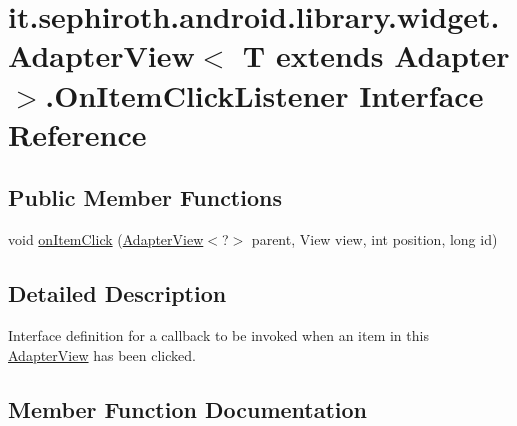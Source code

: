 \hypertarget{interfaceit_1_1sephiroth_1_1android_1_1library_1_1widget_1_1_adapter_view_1_1_on_item_click_listener}{}\section{it.\+sephiroth.\+android.\+library.\+widget.\+Adapter\+View$<$ T extends Adapter $>$.On\+Item\+Click\+Listener Interface Reference}
\label{interfaceit_1_1sephiroth_1_1android_1_1library_1_1widget_1_1_adapter_view_1_1_on_item_click_listener}
\subsection*{Public Member Functions}
\begin{DoxyCompactItemize}
\item 
void \hyperlink{interfaceit_1_1sephiroth_1_1android_1_1library_1_1widget_1_1_adapter_view_1_1_on_item_click_listener_aec9fff2d7de90e08837ae0df6b2f51b4}{on\+Item\+Click} (\hyperlink{classit_1_1sephiroth_1_1android_1_1library_1_1widget_1_1_adapter_view}{Adapter\+View}$<$?$>$ parent, View view, int position, long id)
\end{DoxyCompactItemize}


\subsection{Detailed Description}
Interface definition for a callback to be invoked when an item in this \hyperlink{classit_1_1sephiroth_1_1android_1_1library_1_1widget_1_1_adapter_view}{Adapter\+View} has been clicked. 

\subsection{Member Function Documentation}
\mbox{\label{interfaceit_1_1sephiroth_1_1android_1_1library_1_1widget_1_1_adapter_view_1_1_on_item_click_listener_aec9fff2d7de90e08837ae0df6b2f51b4}} 
